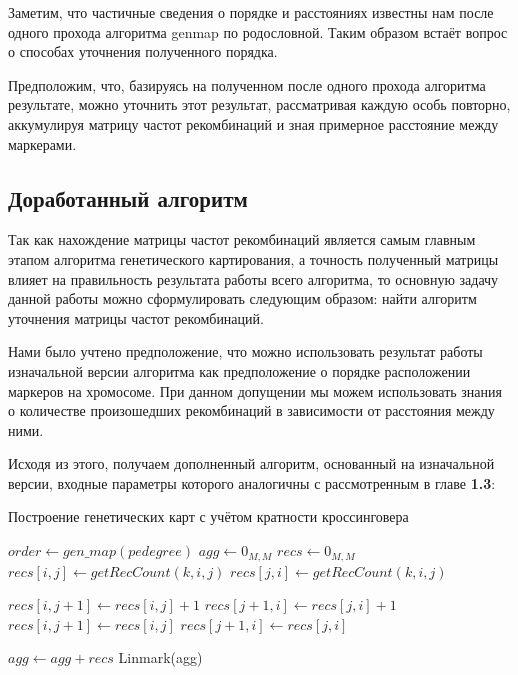\documentclass{matmex-diploma-custom}
\begin{document}
Заметим, что частичные сведения о порядке и расстояниях известны нам
после одного прохода алгоритма genmap по родословной. Таким образом
встаёт вопрос о способах уточнения полученного порядка.

Предположим, что, базируясь на полученном после одного прохода
алгоритма результате, можно уточнить этот результат, рассматривая
каждую особь повторно, аккумулируя матрицу частот рекомбинаций и зная
примерное расстояние между маркерами.

\subsection{Доработанный алгоритм}

Так как нахождение матрицы частот рекомбинаций является самым главным
этапом алгоритма генетического картирования, а точность полученный
матрицы влияет на правильность результата работы всего алгоритма, то
основную задачу данной работы можно сформулировать следующим образом:
найти алгоритм уточнения матрицы частот рекомбинаций.

Нами было учтено предположение, что можно использовать результат
работы изначальной версии алгоритма как предположение о порядке
расположении маркеров на хромосоме. При данном допущении мы можем
использовать знания о количестве произошедших рекомбинаций в
зависимости от расстояния между ними.

Исходя из этого, получаем дополненный алгоритм, основанный на
изначальной версии, входные параметры которого аналогичны с
рассмотренным в главе \textbf{1.3}:

\begin{algorithm}
  \caption{Построение генетических карт с учётом кратности кроссинговера}
  \label{newalgo}
   \begin{algorithmic}[1]
    \State $order \gets gen\_map(pedegree)$
    \State $agg \gets 0_{M, M}$
    \State $recs \gets 0_{M, M}$
      \State $recs[i, j] \gets getRecCount(k, i, j)$
      \State $recs[j, i] \gets getRecCount(k, i, j)$
    \EndFor
    \EndFor


    \State $recs[i, j+1] \gets recs[i, j] +1$
    \State $recs[j+1, i] \gets recs[j, i] +1$
    \EndIf
    \State $recs[i, j+1] \gets recs[i, j]$
    \State $recs[j+1, i] \gets recs[j, i]$
    \EndIf

    \EndFor
    \EndFor
    \State $agg \gets agg + recs$
    \EndFor
    \State \Return Linmark(agg)
    \EndFunction
  \end{algorithmic}
\end{algorithm}
\end{document}
